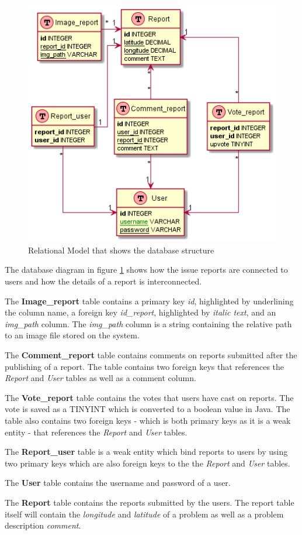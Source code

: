 \begin{figure}[hbt]
\centering
\includegraphics[width=.6\textwidth]{images/relational_model}
\caption{Relational Model that shows the database structure}\label{fig:database_diagram}
\end{figure}

The database diagram in figure \ref{fig:database_diagram} shows how the issue reports are connected to users and how the details of a report is interconnected. 

The \textbf{Image\_report} table contains a primary key \textit{id}, highlighted by underlining the column name, a foreign key \textit{id\_report}, highlighted by \textit{italic text}, and an \textit{img\_path} column. The \textit{img\_path} column is a string containing the relative path to an image file stored on the system. 

The \textbf{Comment\_report} table contains comments on reports submitted after the publishing of a report. The table contains two foreign keys that references the \textit{Report} and \textit{User} tables as well as a comment column.

The \textbf{Vote\_report} table contains the votes that users have cast on reports. The vote is saved as a TINYINT which is converted to a boolean value in Java. The table also contains two foreign keys - which is both primary keys as it is a weak entity - that references the \textit{Report} and \textit{User} tables.

The \textbf{Report\_user} table is a weak entity which bind reports to users by using two primary keys which are also foreign keys to the the \textit{Report} and \textit{User} tables.

The \textbf{User} table contains the username and password of a user.

The \textbf{Report} table contains the reports submitted by the users. The report table itself will contain the \textit{longitude} and \textit{latitude} of a problem as well as a problem description \textit{comment}.


